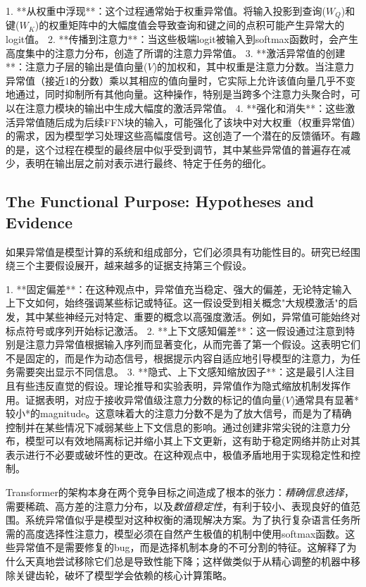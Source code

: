 \documentclass{article}
\begin{document}
1. **从权重中浮现**：这个过程通常始于权重异常值。将输入投影到查询($W_Q$)和键($W_K$)的权重矩阵中的大幅度值会导致查询和键之间的点积可能产生异常大的logit值。
2. **传播到注意力**：当这些极端logit被输入到softmax函数时，会产生高度集中的注意力分布，创造了所谓的注意力异常值。
3. **激活异常值的创建**：注意力子层的输出是值向量($V$)的加权和，其中权重是注意力分数。当注意力异常值（接近1的分数）乘以其相应的值向量时，它实际上允许该值向量几乎不变地通过，同时抑制所有其他向量。这种操作，特别是当跨多个注意力头聚合时，可以在注意力模块的输出中生成大幅度的激活异常值。
4. **强化和消失**：这些激活异常值随后成为后续FFN块的输入，可能强化了该块中对大权重（权重异常值）的需求，因为模型学习处理这些高幅度信号。这创造了一个潜在的反馈循环。有趣的是，这个过程在模型的最终层中似乎受到调节，其中某些异常值的普遍存在减少，表明在输出层之前对表示进行最终、特定于任务的细化。

\subsection{The Functional Purpose: Hypotheses and Evidence}

如果异常值是模型计算的系统和组成部分，它们必须具有功能性目的。研究已经围绕三个主要假设展开，越来越多的证据支持第三个假设。

1. **固定偏差**：在这种观点中，异常值充当稳定、强大的偏差，无论特定输入上下文如何，始终强调某些标记或特征。这一假设受到相关概念"大规模激活"的启发，其中某些神经元对特定、重要的概念以高强度激活。例如，异常值可能始终对标点符号或序列开始标记激活。
2. **上下文感知偏差**：这一假设通过注意到特别是注意力异常值根据输入序列而显著变化，从而完善了第一个假设。这表明它们不是固定的，而是作为动态信号，根据提示内容自适应地引导模型的注意力，为任务需要突出显示不同信息。
3. **隐式、上下文感知缩放因子**：这是最引人注目且有些违反直觉的假设。理论推导和实验表明，异常值作为隐式缩放机制发挥作用。证据表明，对应于接收异常值级注意力分数的标记的值向量($V$)通常具有显著*较小*的magnitude。这意味着大的注意力分数不是为了放大信号，而是为了精确控制并在某些情况下减弱某些上下文信息的影响。通过创建非常尖锐的注意力分布，模型可以有效地隔离标记并缩小其上下文更新，这有助于稳定网络并防止对其表示进行不必要或破坏性的更改。在这种观点中，极值矛盾地用于实现稳定性和控制。

Transformer的架构本身在两个竞争目标之间造成了根本的张力：\emph{精确信息选择}，需要稀疏、高方差的注意力分布，以及\emph{数值稳定性}，有利于较小、表现良好的值范围。系统异常值似乎是模型对这种权衡的涌现解决方案。为了执行复杂语言任务所需的高度选择性注意力，模型必须在自然产生极值的机制中使用softmax函数。这些异常值不是需要修复的bug，而是选择机制本身的不可分割的特征。这解释了为什么天真地尝试移除它们总是导致性能下降；这样做类似于从精心调整的机器中移除关键齿轮，破坏了模型学会依赖的核心计算策略。
\end{document}
